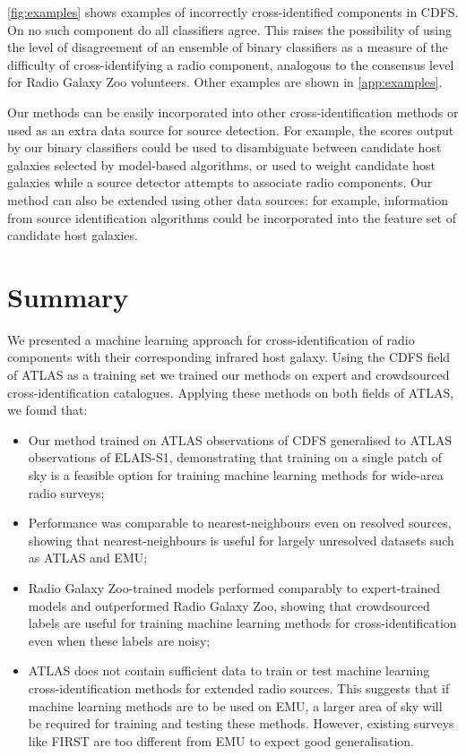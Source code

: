 \documentclass[fleqn,usenatbib,usedcolumn]{mnras}
\newcommand{\edited}[1]{#1}
\begin{document}
  \edited{\autoref{fig:examples} shows examples of incorrectly cross-identified
  components in CDFS. On no such component do all classifiers agree.
  This raises the possibility of using the level of disagreement of an
  ensemble of binary classifiers as a measure of the difficulty of cross-identifying a radio component,
  analogous to the consensus level for Radio Galaxy Zoo volunteers. Other examples are shown in \autoref{app:examples}.}

  Our methods can be easily incorporated into other cross-identification
  methods or used as an extra data source for source detection. For
  example, the scores output by our binary classifiers could be used to
  disambiguate between candidate host
  galaxies selected by model-based algorithms, or used to weight candidate
  host galaxies while a source detector attempts to associate radio
  components. Our method can also be extended using other data sources: for
  example, information from source identification algorithms could be
  incorporated into the feature set of candidate host galaxies.

\section{Summary}

  We presented a machine learning approach for cross-identification of radio
  components with their corresponding infrared host galaxy. Using the CDFS
  field of ATLAS as a training set we trained our
  methods on expert and crowdsourced cross-identification catalogues.
  Applying these methods on both fields of ATLAS, we found that:
  \begin{itemize}
    \item Our method trained on ATLAS observations of CDFS generalised to
    ATLAS observations of ELAIS-S1, demonstrating that training on a single
    patch of sky is a feasible option for training machine learning methods
    for wide-area radio surveys;
    \item Performance was comparable to nearest-neighbours even on resolved
    sources, showing that nearest-neighbours is useful for largely unresolved
    datasets such as ATLAS and EMU;
    \item Radio Galaxy Zoo-trained models performed comparably to
    expert-trained models and outperformed Radio Galaxy Zoo, showing that
    crowdsourced labels are useful for training machine learning methods for
    cross-identification even when these labels are noisy;
    \item ATLAS does not contain sufficient data to train or test machine
    learning cross-identification methods for extended radio sources. This
    suggests that if machine learning methods are to be used on EMU, a larger
    area of sky will be required for training and testing these methods.
    However, existing surveys like FIRST are too different from EMU to expect
    good generalisation.
  \end{itemize}
\end{document}
